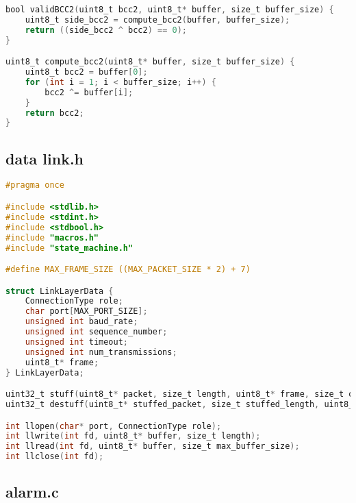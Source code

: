 \begin{lstlisting}[language=C, caption=data_link.c]
bool validBCC2(uint8_t bcc2, uint8_t* buffer, size_t buffer_size) {
    uint8_t side_bcc2 = compute_bcc2(buffer, buffer_size);
    return ((side_bcc2 ^ bcc2) == 0);
}

uint8_t compute_bcc2(uint8_t* buffer, size_t buffer_size) {
    uint8_t bcc2 = buffer[0];
    for (int i = 1; i < buffer_size; i++) {
        bcc2 ^= buffer[i];
    }
    return bcc2;
}

\end{lstlisting}

\subsection{data \textunderscore link.h}

\begin{lstlisting}[language=C, caption=data_link.h]
#pragma once

#include <stdlib.h>
#include <stdint.h>
#include <stdbool.h>
#include "macros.h"
#include "state_machine.h"

#define MAX_FRAME_SIZE ((MAX_PACKET_SIZE * 2) + 7)

struct LinkLayerData {
    ConnectionType role;
    char port[MAX_PORT_SIZE];
    unsigned int baud_rate;
    unsigned int sequence_number;
    unsigned int timeout;
    unsigned int num_transmissions;
    uint8_t* frame;
} LinkLayerData;

uint32_t stuff(uint8_t* packet, size_t length, uint8_t* frame, size_t occupied_bytes);
uint32_t destuff(uint8_t* stuffed_packet, size_t stuffed_length, uint8_t* unstuffed_packet, size_t max_unstuffed_packet_size);

int llopen(char* port, ConnectionType role);
int llwrite(int fd, uint8_t* buffer, size_t length);
int llread(int fd, uint8_t* buffer, size_t max_buffer_size);
int llclose(int fd);

\end{lstlisting}

\subsection{alarm.c}

